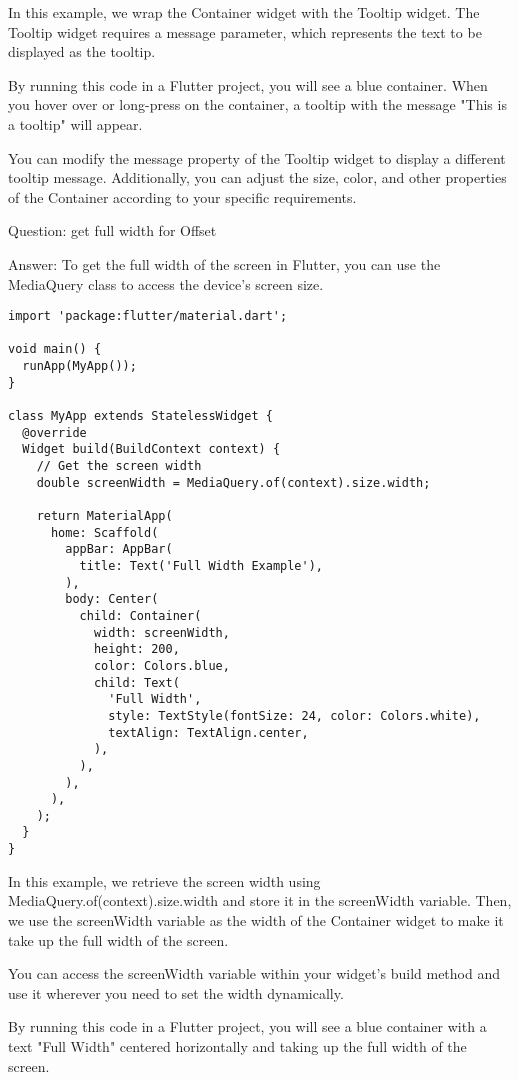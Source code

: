 In this example, we wrap the Container widget with the Tooltip widget. The Tooltip widget requires a message parameter, 
which represents the text to be displayed as the tooltip.

By running this code in a Flutter project, you will see a blue container. When you hover over or long-press on 
the container, a tooltip with the message "This is a tooltip" will appear.

You can modify the message property of the Tooltip widget to display a different tooltip message. Additionally, 
you can adjust the size, color, and other properties of the Container according to your specific requirements.


Question: get full width for Offset

Answer: To get the full width of the screen in Flutter, you can use the MediaQuery class to access the 
device's screen size.

\begin{lstlisting}
import 'package:flutter/material.dart';

void main() {
  runApp(MyApp());
}

class MyApp extends StatelessWidget {
  @override
  Widget build(BuildContext context) {
    // Get the screen width
    double screenWidth = MediaQuery.of(context).size.width;

    return MaterialApp(
      home: Scaffold(
        appBar: AppBar(
          title: Text('Full Width Example'),
        ),
        body: Center(
          child: Container(
            width: screenWidth,
            height: 200,
            color: Colors.blue,
            child: Text(
              'Full Width',
              style: TextStyle(fontSize: 24, color: Colors.white),
              textAlign: TextAlign.center,
            ),
          ),
        ),
      ),
    );
  }
}
\end{lstlisting}

In this example, we retrieve the screen width using MediaQuery.of(context).size.width and store it in the screenWidth 
variable. Then, we use the screenWidth variable as the width of the Container widget to make it take up the full 
width of the screen.

You can access the screenWidth variable within your widget's build method and use it wherever you need to set 
the width dynamically.

By running this code in a Flutter project, you will see a blue container with a text "Full Width" centered 
horizontally and taking up the full width of the screen.

